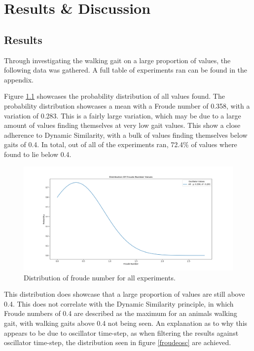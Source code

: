 \chapter{Results \& Discussion}
\section{Results}


Through investigating the walking gait on a large proportion of values, the following data was gathered. A full table of experiments ran can be found in the appendix. 

Figure \ref{froudedistribution} showcases the probability distribution of all values found. The probability distribution showcases a mean  with a Froude number of 0.358, with a variation of 0.283. This is a fairly large variation, which may be due to a large amount of values finding themselves at very low gait values. This show a close adherence to Dynamic Similarity, with a bulk of values finding themselves below gaits of 0.4. In total, out of all of the experiments ran, 72.4\% of values where found to lie below 0.4. 

\begin{figure}[h!]
  \centering
  \includegraphics[width=1\textwidth]{USFD_Academic-_Report_LaTeX-Template/figures/froudedistribution.png}
  \caption{Distribution of froude number for all experiments.}
  \label{froudedistribution}
\end{figure}

This distribution does showcase that a large proportion of values are still above 0.4. This does not correlate with the Dynamic Similarity principle, in which Froude numbers of 0.4 are described as the maximum for an animals walking gait, with walking gaits above 0.4 not being seen. An explanation as to why this appears to be due to oscillator time-step, as when filtering the results against oscillator time-step, the distribution seen in figure \ref{froudeosc} are achieved.

